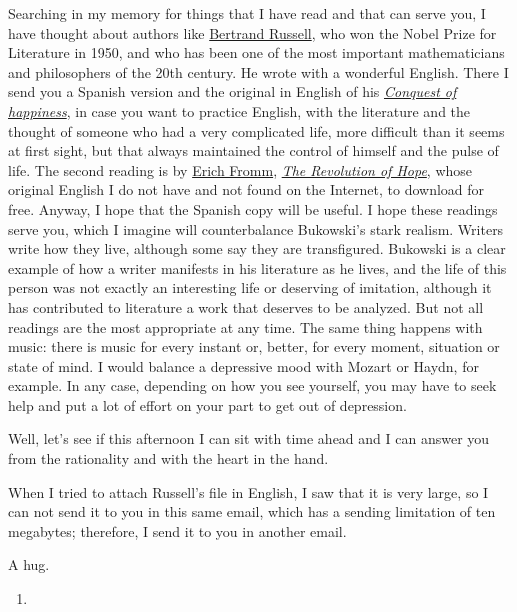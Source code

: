 \documentclass[]{book}
\begin{document}
Searching in my memory for things that I have read and that can serve you, I have thought about authors like \href{https://en.wikipedia.org/wiki/Bertrand_Russell}{Bertrand Russell}, who won the Nobel Prize for Literature in 1950, and who has been one of the most important mathematicians and philosophers of the 20th century. He wrote with a wonderful English. There I send you a Spanish version and the original in English of his \href{https://russell-j.com/beginner/COH-TEXT.HTM}{\emph{Conquest of happiness}}\citep{bertrand1930conquest}, in case you want to practice English, with the literature and the thought of someone who had a very complicated life, more difficult than it seems at first sight, but that always maintained the control of himself and the pulse of life. The second reading is by \href{https://en.wikipedia.org/wiki/Erich_Fromm}{Erich Fromm}, \href{https://books.google.de/books/about/The_Revolution_of_Hope.html?id=SVdy0rtho0kC\&redir_esc=y}{\emph{The Revolution of Hope}}, whose original English I do not have and not found on the Internet, to download for free. Anyway, I hope that the Spanish copy will be useful. I hope these readings serve you, which I imagine will counterbalance Bukowski's stark realism. Writers write how they live, although some say they are transfigured. Bukowski is a clear example of how a writer manifests in his literature as he lives, and the life of this person was not exactly an interesting life or deserving of imitation, although it has contributed to literature a work that deserves to be analyzed. But not all readings are the most appropriate at any time. The same thing happens with music: there is music for every instant or, better, for every moment, situation or state of mind. I would balance a depressive mood with Mozart or Haydn, for example. In any case, depending on how you see yourself, you may have to seek help and put a lot of effort on your part to get out of depression.

Well, let's see if this afternoon I can sit with time ahead and I can answer you from the rationality and with the heart in the hand.

When I tried to attach Russell's file in English, I saw that it is very large, so I can not send it to you in this same email, which has a sending limitation of ten megabytes; therefore, I send it to you in another email.

A hug.

\begin{enumerate}
\def\labelenumi{\Alph{enumi}.}
\setcounter{enumi}{19}
\item
\end{enumerate}
\end{document}
